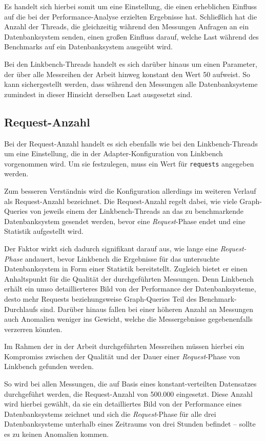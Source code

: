 Es handelt sich hierbei somit um eine Einstellung, die einen erheblichen Einfluss auf die bei der Performance-Analyse erzielten Ergebnisse hat. Schließlich hat die Anzahl der Threads, die gleichzeitig während den Messungen Anfragen an ein Datenbanksystem senden, einen großen Einfluss darauf, welche Last während des Benchmarks auf ein Datenbanksystem ausgeübt wird. 

Bei den Linkbench-Threads handelt es sich darüber hinaus um einen Parameter, der über alle Messreihen der Arbeit hinweg konstant den Wert 50 aufweist. So kann sichergestellt werden, dass während den Messungen alle Datenbanksysteme zumindest in dieser Hinsicht derselben Last ausgesetzt sind. 

\subsection{Request-Anzahl}
\label{analyse:request_anzahl}
Bei der Request-Anzahl handelt es sich ebenfalls wie bei den Linkbench-Threads um eine Einstellung, die in der Adapter-Konfiguration von Linkbench vorgenommen wird. Um sie festzulegen, muss ein Wert für \texttt{requests} angegeben werden. 

Zum besseren Verständnis wird die Konfiguration allerdings im weiteren Verlauf als Request-Anzahl bezeichnet. Die Request-Anzahl regelt dabei, wie viele Graph-Queries von jeweils einem der Linkbench-Threads an das zu benchmarkende Datenbanksystem gesendet werden, bevor eine \textit{Request}-Phase endet und eine Statistik aufgestellt wird. 

Der Faktor wirkt sich dadurch signifikant darauf aus, wie lange eine \textit{Request-Phase} andauert, bevor Linkbench die Ergebnisse für das untersuchte Datenbanksystem in Form einer Statistik bereitstellt. Zugleich bietet er einen Anhaltspunkt für die Qualität der durchgeführten Messungen. Denn Linkbench erhält ein umso detaillierteres Bild von der Performance der Datenbanksysteme, desto mehr Requests beziehungsweise Graph-Queries Teil des Benchmark-Durchlaufs sind. Darüber hinaus fallen bei einer höheren Anzahl an Messungen auch Anomalien weniger ins Gewicht, welche die Messergebnisse gegebenenfalls verzerren könnten.

Im Rahmen der in der Arbeit durchgeführten Messreihen müssen hierbei ein Kompromiss zwischen der Qualität und der Dauer einer \textit{Request}-Phase von Linkbench gefunden werden. 

So wird bei allen Messungen, die auf Basis eines konstant-verteilten Datensatzes durchgeführt werden, die Request-Anzahl von 500.000 eingesetzt. Diese Anzahl wird hierbei gewählt, da sie ein detailliertes Bild von der Performance eines Datenbanksystems zeichnet und sich die \textit{Request}-Phase für alle drei Datenbanksysteme unterhalb eines Zeitraums von drei Stunden befindet -- sollte es zu keinen Anomalien kommen. 

